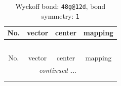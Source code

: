 \documentclass[fleqn,8pt]{jsarticle}
\begin{document}
\renewcommand{\arraystretch}{1.2}
\begin{longtable}{cccc}
\caption{Wyckoff bond: {\tt 48g@12d}, bond symmetry: {\tt 1}}
 \\
 \hline \hline
No. & vector & center & mapping \\ \hline \endfirsthead

\multicolumn{3}{l}{\tablename\ \thetable{}} \\
 \hline \hline
No. & vector & center & mapping \\ \hline \endhead

 \hline \hline
\multicolumn{3}{r}{\footnotesize\it continued ...} \\ \endfoot

 \hline \hline
\multicolumn{3}{r}{} \\ \endlastfoot


\end{longtable}
\end{document}
